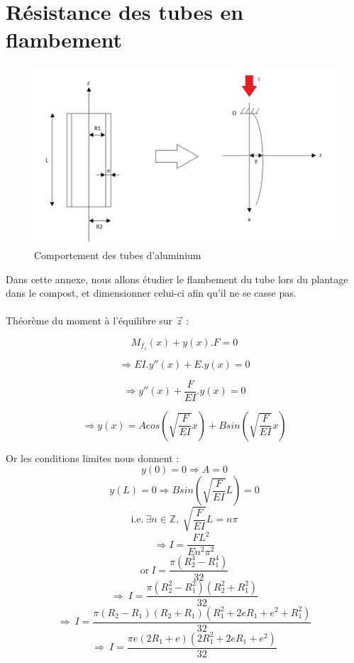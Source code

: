 \documentclass[../PS6_RapportFinal.tex]{subfiles}
\begin{document}
\graphicspath{{img/}{tex/img/}}


\section{Résistance des tubes en flambement}


\begin{figure}[h]
\begin{center}
\includegraphics{5_1_resistance_tube.png}
\caption[width=10cm]{Comportement des tubes d'aluminium}
\label{tube_aluminium} %
\end{center}
\end{figure}

Dans cette annexe, nous allons étudier le flambement du tube lors du plantage dans le compost, et dimensionner celui-ci afin qu'il ne se casse pas.
\\
\\
Théorème du moment à l'équilibre sur $\vec{z}$ :

\[M_{f_{z}}(x) + y(x).F = 0\]

\[\Rightarrow EI.y''(x)+E.y(x) = 0\]

\[\Rightarrow y''(x) + \frac{F}{EI}.y(x) = 0\]

\[\Rightarrow y(x) = Acos(\sqrt{\frac{F}{EI}}x)+Bsin(\sqrt{\frac{F}{EI}}x)\]

Or les conditions limites nous donnent :
\[y(0) = 0 \Rightarrow A = 0\]
\[y(L) = 0 \Rightarrow Bsin(\sqrt{\frac{F}{EI}}L) = 0\]
\[\text{i.e.} \: \exists n \in \mathbb{Z}, \: \sqrt{\frac{F}{EI}}L = n\pi\]
\[\Rightarrow I = \frac{FL^{2}}{En^{2}\pi^{2}}\]
\[\text{or} \: I = \frac{\pi(R_{2}^{4}-R_{1}^{4})}{32}\]
\[\Rightarrow \: I = \frac{\pi(R_{2}^{2}-R_{1}^{2})(R_{2}^{2}+R_{1}^{2})}{32}\]
\[\Rightarrow \: I = \frac{\pi(R_{2}-R_{1})(R_{2}+R_{1})(R_{1}^{2}+2eR_{1}+e^{2}+R_{1}^{2})}{32}\]
\[\Rightarrow \: I = \frac{\pi e(2R_{1}+e)(2R_{1}^{2}+2eR_{1}+e^{2})}{32}\]
\end{document}
